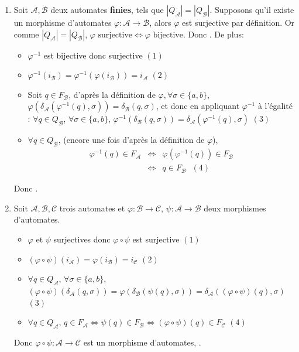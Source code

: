 \documentclass{article}
\begin{document}
\begin{enumerate}
    \item \label{itm:isomorphisme} Soit $\mathcal{A}, \mathcal{B}$ deux automates \textbf{finies}, tels que $|Q_\mathcal{A}| = |Q_\mathcal{B}|$. Supposons qu'il existe un morphisme d'automates $\varphi : \mathcal{A} \rightarrow \mathcal{B}$, alors $\varphi$ est surjective par définition. Or comme $|Q_\mathcal{A}| = |Q_\mathcal{B}|$, $\varphi \text{ surjective} \Leftrightarrow \varphi \text{ bijective}$. Donc . \newline
    De plus: \begin{itemize}
        \item $\varphi^{-1}$ est bijective donc surjective $(1)$
        \item $\varphi^{-1}(i_\mathcal{B}) = \varphi^{-1}(\varphi(i_\mathcal{B})) = i_\mathcal{A}$ $(2)$
        \item Soit $q \in F_\mathcal{B}$, d'après la définition de $\varphi, \forall \sigma \in \{ a, b\}$, $\varphi(\delta_\mathcal{A}(\varphi^{-1}(q), \sigma)) = \delta_\mathcal{B}(q, \sigma)$, et donc en appliquant $\varphi^{-1}$ à l'égalité : \newline
        $\forall q \in Q_\mathcal{B}$, $\forall \sigma \in \{ a, b\}$, $ \varphi^{-1}(\delta_\mathcal{B}(q, \sigma)) = \delta_\mathcal{A}(\varphi^{-1}(q), \sigma)$ $(3)$
        \item $\forall q \in Q_\mathcal{B}$, (encore une fois d'après la définition de $\varphi$), \begin{eqnarray*}
            \varphi^{-1}(q) \in F_\mathcal{A} & \Longleftrightarrow & \varphi(\varphi^{-1}(q)) \in F_\mathcal{B} \\
            & \Longleftrightarrow & q \in F_\mathcal{B} \text{ $(4)$}
        \end{eqnarray*}
    \end{itemize}
    Donc .
    \item \label{itm:composition} Soit $\mathcal{A}, \mathcal{B}, \mathcal{C}$ trois automates et  $\varphi : \mathcal{B} \rightarrow \mathcal{C}$,  $\psi : \mathcal{A} \rightarrow \mathcal{B}$ deux morphismes d'automates.
    \begin{itemize}
        \item $\varphi$ et $\psi$ surjectives donc $\varphi \circ \psi$ est surjective $(1)$
        \item $(\varphi \circ \psi)(i_\mathcal{A}) = \varphi(i_\mathcal{B}) = i_\mathcal{C}$ $(2)$
        \item  $\forall q \in Q_\mathcal{A}$, $\forall \sigma \in \{ a, b\}$, $(\varphi \circ \psi)(\delta_\mathcal{A}(q, \sigma)) = \varphi(\delta_\mathcal{B}(\psi(q), \sigma)) = \delta_\mathcal{A}((\varphi \circ \psi)(q), \sigma)$ $(3)$
        \item $\forall q \in Q_\mathcal{A}$, $q \in F_\mathcal{A} \Longleftrightarrow \psi(q) \in F_\mathcal{B} \Longleftrightarrow (\varphi \circ \psi)(q) \in F_\mathcal{C}$ $(4)$
    \end{itemize}
    Donc $\varphi \circ \psi : \mathcal{A} \rightarrow \mathcal{C}$ est un morphisme d'automates, .
\end{enumerate}
\end{document}
